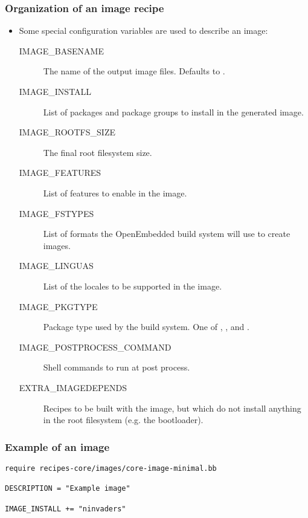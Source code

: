 \begin{frame}
  \frametitle{Organization of an image recipe}
  \begin{itemize}
    \item Some special configuration variables are used to describe an
      image:
      \begin{description}
        \item[IMAGE\_BASENAME] The name of the output image files.
          Defaults to .
        \item[IMAGE\_INSTALL] List of packages and package groups to
          install in the generated image.
        \item[IMAGE\_ROOTFS\_SIZE] The final root filesystem size.
        \item[IMAGE\_FEATURES] List of features to enable in the
          image.
        \item[IMAGE\_FSTYPES] List of formats the OpenEmbedded build
          system will use to create images.
        \item[IMAGE\_LINGUAS] List of the locales to be supported in
          the image.
        \item[IMAGE\_PKGTYPE] Package type used by the build system.
          One of , ,  and .
        \item[IMAGE\_POSTPROCESS\_COMMAND] Shell commands to run at
          post process.
        \item[EXTRA\_IMAGEDEPENDS] Recipes to be built with the image, but
          which do not install anything in the root filesystem
          (e.g. the bootloader).
      \end{description}
  \end{itemize}
\end{frame}

\begin{frame}[fragile]
  \frametitle{Example of an image}
  \begin{block}{}
    \begin{verbatim}
require recipes-core/images/core-image-minimal.bb

DESCRIPTION = "Example image"

IMAGE_INSTALL += "ninvaders"
    \end{verbatim}
  \end{block}
\end{frame}

